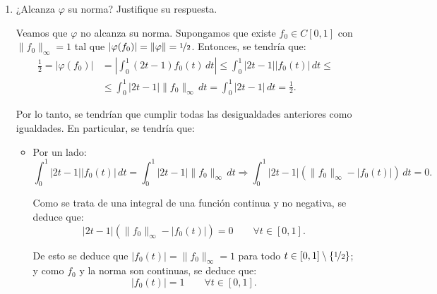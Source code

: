 \documentclass[12pt]{article}
\begin{document}
\begin{ejercicio}
\begin{enumerate}[label=\alph*)]
            Tomando el límite cuando $n \to \infty$, se obtiene que:
            \begin{equation*}
                \|\varphi\| \geq \frac{1}{2}.
            \end{equation*}

            Combinando esto con la desigualdad anterior, se concluye que:
            \begin{equation*}
                \|\varphi\| = \frac{1}{2}.
            \end{equation*}



            \item ¿Alcanza $\varphi$ su norma? Justifique su respuesta.
            
            Veamos que $\varphi$ no alcanza su norma. Supongamos que existe $f_0 \in C\left[0, 1\right]$ con $\|f_0\|_\infty = 1$ tal que $|\varphi(f_0)| = \|\varphi\| = \nicefrac{1}{2}$. Entonces, se tendría que:
            \begin{align*}
                \frac{1}{2} = |\varphi(f_0)| &= \left|\int_0^1 (2t - 1) f_0(t) \,dt\right| \leq \int_0^1 |2t - 1| |f_0(t)| \, dt \leq \\ &\leq \int_0^1 |2t - 1| \|f_0\|_\infty \, dt = \int_0^1 |2t - 1| \, dt = \frac{1}{2}.
            \end{align*}

            Por lo tanto, se tendrían que cumplir todas las desigualdades anteriores como igualdades. En particular, se tendría que:
            \begin{itemize}
                \item Por un lado:
                \begin{equation*}
                    \int_0^1 |2t - 1| |f_0(t)| \, dt = \int_0^1 |2t - 1| \|f_0\|_\infty \, dt
                    \Longrightarrow
                    \int_0^1 |2t - 1| (\|f_0\|_\infty - |f_0(t)|) \, dt = 0.
                \end{equation*}

                Como se trata de una integral de una función continua y no negativa, se deduce que:
                \begin{equation*}
                    |2t - 1| (\|f_0\|_\infty - |f_0(t)|) = 0 \qquad \forall t \in [0, 1].
                \end{equation*}

                De esto se deduce que $|f_0(t)| = \|f_0\|_\infty = 1$ para todo $t \in [0, 1] \setminus \{\nicefrac{1}{2}\}$; y como $f_0$ y la norma son continuas, se deduce que:
                \begin{equation*}
                    |f_0(t)| = 1 \qquad \forall t \in [0, 1].
                \end{equation*}


\end{itemize}
\end{enumerate}
\end{ejercicio}
\end{document}
